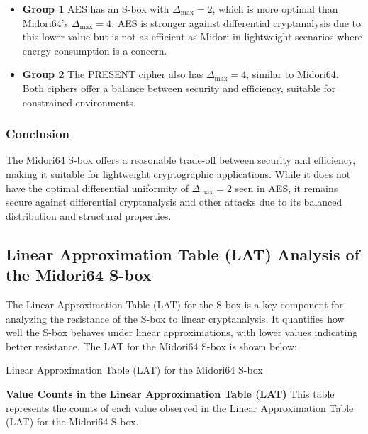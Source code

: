 \documentclass[10pt, a4paper]{article}
\begin{document}
\begin{itemize}
	\item \textbf{Group 1} AES has an S-box with \( \Delta_{\text{max}} = 2 \),
	      which is more optimal than Midori64's \( \Delta_{\text{max}} = 4 \). AES is
	      stronger against differential cryptanalysis due to this lower value but is
	      not as efficient as Midori in lightweight scenarios where energy consumption
	      is a concern.
	\item \textbf{Group 2} The PRESENT cipher also has \( \Delta_{\text{max}} = 4 \),
	      similar to Midori64. Both ciphers offer a balance between security and
	      efficiency, suitable for constrained environments.
\end{itemize}

\subsubsection*{Conclusion}

The Midori64 S-box offers a reasonable trade-off between security and
efficiency, making it suitable for lightweight cryptographic applications. While
it does not have the optimal differential uniformity of \( \Delta_{\text{max}} = 2 \)
seen in AES, it remains secure against differential cryptanalysis and other
attacks due to its balanced distribution and structural properties.
\pagebreak

\subsection*{Linear Approximation Table (LAT) Analysis of the Midori64 S-box}

\noindent The Linear Approximation Table (LAT) for the S-box is a key component
for analyzing the resistance of the S-box to linear cryptanalysis. It quantifies
how well the S-box behaves under linear approximations, with lower values
indicating better resistance. The LAT for the Midori64 S-box is shown below:

\begin{table}[h!]
	\centering
	\label{tab:lat}
	\caption{Linear Approximation Table (LAT) for the Midori64 S-box}
	\setlength{\tabcolsep}{8pt}
	\vspace{12pt}
	 
\end{table}

\textbf{Value Counts in the Linear Approximation Table (LAT)}
This table represents the counts of each value observed in the Linear
Approximation Table (LAT) for the Midori64 S-box.
\end{document}
